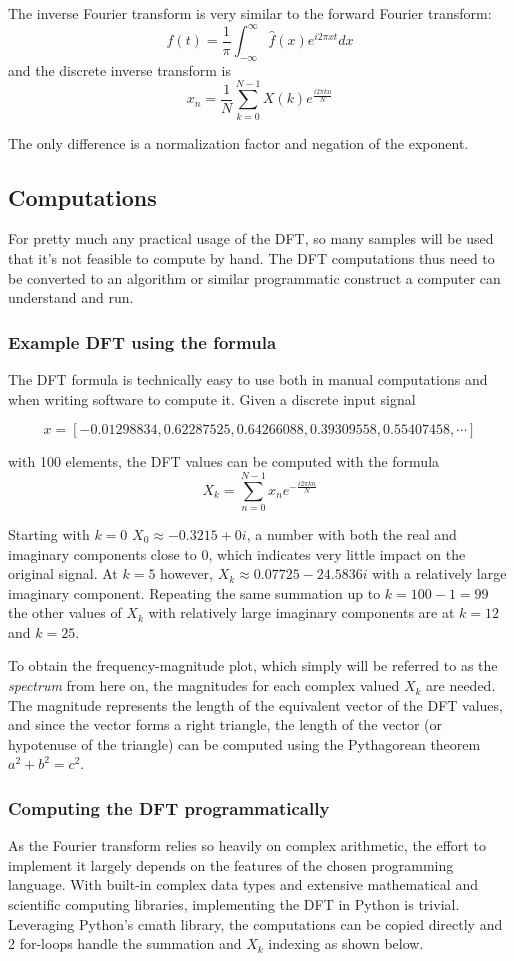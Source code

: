 The inverse Fourier transform is very similar to the forward Fourier transform:
$$ f(t) = \frac{1}{\pi}\int_{-\infty}^{\infty} \hat{f}(x)e^{i2\pi xt} dx$$
and the discrete inverse transform is 
$$ x_n = \frac{1}{N}\sum_{k=0}^{N-1} X(k)e^{\frac{i2\pi kn}{N}}$$

The only difference is a normalization factor and negation of the exponent.

\subsection{Computations}
For pretty much any practical usage of the DFT, so many samples will be used that it's not feasible to compute by hand. The DFT computations thus need to be converted to an algorithm or similar programmatic construct a computer can understand and run.

\subsubsection{Example DFT using the formula}
The DFT formula is technically easy to use both in manual computations and when writing software to compute it. Given a discrete input signal 

$$x = [-0.01298834,  0.62287525,  0.64266088,  0.39309558,  0.55407458, \cdots]$$

with 100 elements, the DFT values can be computed with the formula $$X_k = \sum_{n=0}^{N-1} x_ne^{-\frac{i2\pi kn}{N}}$$

Starting with $k=0$ $X_0 \approx -0.3215+0i$, a number with both the real and imaginary components close to 0, which indicates very little impact on the original signal. At $k=5$ however, $X_k \approx 0.07725-24.5836i$ with a relatively large imaginary component. Repeating the same summation up to $k=100-1 = 99$ the other values of $X_k$ with relatively large imaginary components are at $k=12$ and $k=25$. 

To obtain the frequency-magnitude plot, which simply will be referred to as the \textit{spectrum} from here on, the magnitudes for each complex valued $X_k$ are needed. The magnitude represents the length of the equivalent vector of the DFT values, and since the vector forms a right triangle, the length of the vector (or hypotenuse of the triangle) can be computed using the Pythagorean theorem $a^2 + b^2 = c^2$. 


\subsubsection{Computing the DFT programmatically}
As the Fourier transform relies so heavily on complex arithmetic, the effort to implement it largely depends on the features of the chosen programming language. With built-in complex data types and extensive mathematical and scientific computing libraries, implementing the DFT in Python is trivial. Leveraging Python's cmath library, the computations can be copied directly and 2 for-loops handle the summation and $X_k$ indexing as shown below.

